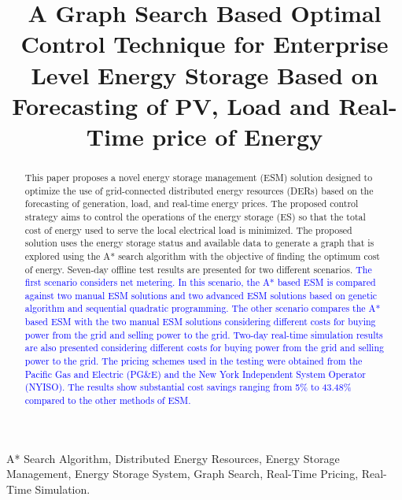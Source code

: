 \documentclass[journal]{IEEEtran}
\begin{document}
\title{A Graph Search Based Optimal Control Technique for Enterprise Level Energy Storage Based on Forecasting of PV, Load and Real-Time price of Energy}

        
\maketitle
\begin{abstract}
This paper proposes a novel energy storage management (ESM) solution designed to optimize the use of grid-connected distributed energy resources (DERs) based on the forecasting of generation, load, and real-time energy prices. The proposed control strategy aims to control the operations of the energy storage (ES) so that the total cost of energy used to serve the local electrical load is minimized. The proposed solution uses the energy storage status and available data to generate a graph that is explored using the A* search algorithm with the objective of finding the optimum cost of energy. Seven-day offline test results are presented for two different scenarios. \textcolor{blue}{The first scenario considers net metering. In this scenario, the A* based ESM is compared against two manual ESM solutions and two advanced  ESM solutions based on genetic algorithm and sequential quadratic programming. The other scenario compares the A* based ESM with the two manual ESM solutions considering different costs for buying power from the grid and selling power to the grid. Two-day real-time simulation results are also presented considering different costs for buying power from the grid and selling power to the grid. The pricing schemes used in the testing were obtained from the Pacific Gas and Electric (PG\&E) and the New York Independent System Operator (NYISO). The results show substantial cost savings ranging from 5\% to 43.48\% compared to the other methods of ESM.} %
\end{abstract}
                                         
\begin{IEEEkeywords}
 A* Search Algorithm, Distributed Energy Resources, Energy Storage Management, Energy Storage System, Graph Search, Real-Time Pricing, Real-Time Simulation.
\end{IEEEkeywords}
\end{document}
